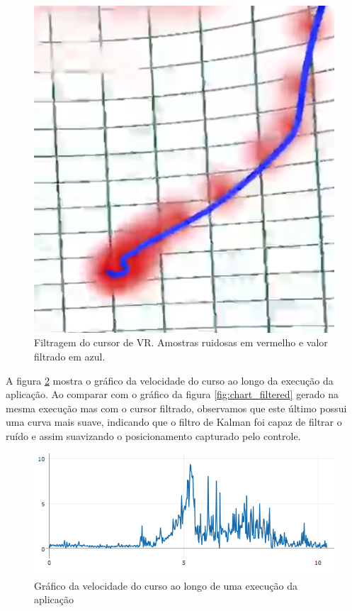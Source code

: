 \documentclass{vgtc}                          %
\begin{document}
\begin{figure}[h!]
\centering
\includegraphics[width=\linewidth]{image_02.png}
\caption{Filtragem do cursor de VR. Amostras ruidosas em vermelho e valor filtrado em azul.}
\label{fig:filter02}
\end{figure}

\FloatBarrier %

A figura \ref{fig:chart_noise} mostra o gráfico da velocidade do curso ao longo da execução da aplicação. Ao comparar com o gráfico da figura \ref{fig:chart_filtered} gerado na mesma execução mas com o cursor filtrado, observamos que este último possui uma curva mais suave, indicando que o filtro de Kalman foi capaz de filtrar o ruído e assim suavizando o posicionamento capturado pelo controle.

\begin{figure}[h!]
\centering
\includegraphics[width=\linewidth]{chart_noise.png}
\caption{Gráfico da velocidade do curso ao longo de uma execução da aplicação}
\label{fig:chart_noise}
\end{figure}
\end{document}
